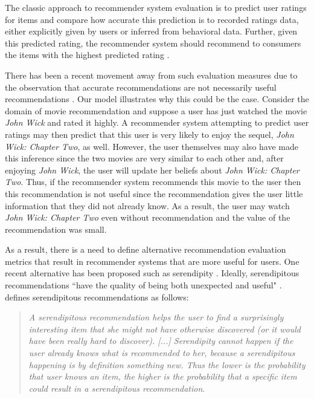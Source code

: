 \documentclass[sigconf]{acmart}
\begin{document}
The classic approach to recommender system evaluation is to predict user ratings for items and compare how accurate this prediction is to recorded ratings data, either explicitly given by users or inferred from behavioral data. Further, given this predicted rating, the recommender system should recommend to consumers the items with the highest predicted rating \cite{adomavicius2005toward}.

There has been a recent movement away from such evaluation measures due to the observation that accurate recommendations are not necessarily useful recommendations \cite{mcnee2006being}. Our model illustrates why this could be the case. Consider the domain of movie recommendation and suppose a user has just watched the movie \textit{John Wick} and rated it highly. A recommender system attempting to predict user ratings may then predict that this user is very likely to enjoy the sequel, \textit{John Wick: Chapter Two}, as well. However, the user themselves may also have made this inference since the two movies are very similar to each other and, after enjoying \textit{John Wick}, the user will update her beliefs about \textit{John Wick: Chapter Two}. Thus, if the recommender system recommends this movie to the user then this recommendation is not useful since the recommendation gives the user little information that they did not already know. As a result, the user may watch \textit{John Wick: Chapter Two} even without recommendation and the value of the recommendation was small.

As a result, there is a need to define alternative recommendation evaluation metrics that result in recommender systems that are more useful for users. One recent alternative has been proposed such as serendipity
\cite{kotkov2016survey, kotkov2016challenges}. Ideally, serendipitous recommendations ``have the quality of being both unexpected and useful" \cite{maksai2015predicting}. \cite{iaquinta2010can} defines serendipitous recommendations as follows:
\begin{quote}
\textit{A serendipitous recommendation helps the
user to find a surprisingly interesting item that
she might not have otherwise discovered (or it
would have been really hard to discover). [...]
Serendipity cannot happen if the user already
knows what is recommended to her, because a
serendipitous happening is by definition something new. Thus the lower is the probability that user knows an item, the higher is the
probability that a specific item could result
in a serendipitous recommendation}.
\end{quote}
\end{document}
